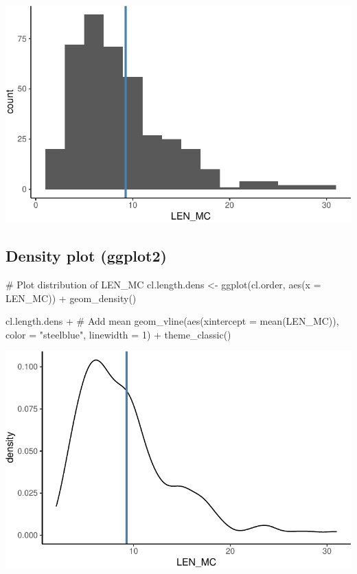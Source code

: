 \documentclass[
  11pt,
  letterpaper,
  DIV=11,
  numbers=noendperiod]{scrreprt}
\newenvironment{Shaded}{\begin{snugshade}}{\end{snugshade}}
\newcommand{\AttributeTok}[1]{\textcolor[rgb]{0.40,0.45,0.13}{#1}}
\newcommand{\CommentTok}[1]{\textcolor[rgb]{0.37,0.37,0.37}{#1}}
\newcommand{\DecValTok}[1]{\textcolor[rgb]{0.68,0.00,0.00}{#1}}
\newcommand{\FunctionTok}[1]{\textcolor[rgb]{0.28,0.35,0.67}{#1}}
\newcommand{\NormalTok}[1]{\textcolor[rgb]{0.00,0.23,0.31}{#1}}
\newcommand{\OtherTok}[1]{\textcolor[rgb]{0.00,0.23,0.31}{#1}}
\newcommand{\SpecialCharTok}[1]{\textcolor[rgb]{0.37,0.37,0.37}{#1}}
\newcommand{\StringTok}[1]{\textcolor[rgb]{0.13,0.47,0.30}{#1}}
\begin{document}
\includegraphics{Summary_statistics_files/figure-pdf/unnamed-chunk-4-1.pdf}

\subsection{Density plot (ggplot2)}

\begin{Shaded}
\begin{Highlighting}[]
\CommentTok{\# Plot distribution of LEN\_MC}
\NormalTok{cl.length.dens }\OtherTok{\textless{}{-}} \FunctionTok{ggplot}\NormalTok{(cl.order, }\FunctionTok{aes}\NormalTok{(}\AttributeTok{x =}\NormalTok{ LEN\_MC)) }\SpecialCharTok{+}
                  \FunctionTok{geom\_density}\NormalTok{()}

\NormalTok{cl.length.dens }\SpecialCharTok{+}
  \CommentTok{\# Add mean}
  \FunctionTok{geom\_vline}\NormalTok{(}\FunctionTok{aes}\NormalTok{(}\AttributeTok{xintercept =} \FunctionTok{mean}\NormalTok{(LEN\_MC)),}
             \AttributeTok{color =} \StringTok{"steelblue"}\NormalTok{,}
             \AttributeTok{linewidth =} \DecValTok{1}\NormalTok{) }\SpecialCharTok{+}
  \FunctionTok{theme\_classic}\NormalTok{()}
\end{Highlighting}
\end{Shaded}

\includegraphics{Summary_statistics_files/figure-pdf/unnamed-chunk-5-1.pdf}
\end{document}
